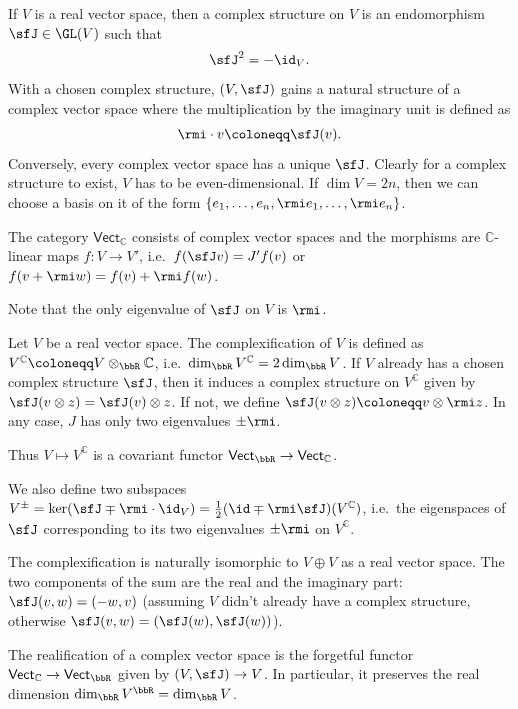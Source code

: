 \begin{defn}
    If $V$ is a real vector space, then a complex structure on $V$ is an endomorphism $\sfJ\in \GL(V)$ such that 
    \[\sfJ^2=-\id_V.\]
    With a chosen complex structure, $(V,\sfJ)$ gains a natural structure of a complex vector space where the multiplication by the imaginary unit is defined as
    \[\rmi\cdot v\coloneqq \sfJ(v).\]
    Conversely, every complex vector space has a unique $\sfJ$. Clearly for a complex structure to exist, $V$ has to be even-dimensional. If $\dim V=2n$, then we can choose a basis on it of the form $\{e_1,\ldots,e_n,\rmi e_1,\ldots,\rmi e_n\}$.
    
    The category $\mathsf{Vect}_{\mathbb{C}}$ consists of complex vector spaces and the morphisms are $\mathbb{C}$-linear maps $f:V\to V'$, i.e.\ $f(\sfJ v)=J' f(v)$ or $f(v+\rmi w)=f(v)+\rmi f(w)$.
\end{defn}

Note that the only eigenvalue of $\sfJ$ on $V$ is $\rmi$.

\begin{defn}[Complexification]\label{def complexification}
    Let $V$ be a real vector space. The complexification of $V$ is defined as $V^\mathbb{C}\coloneqq V\otimes_\bbR \mathbb{C}$, i.e.\ $\dim_\bbR V^\mathbb{C}=2\dim_\bbR V$. If $V$ already has a chosen complex structure $\sfJ$, then it induces a complex structure on $V^\mathbb{C}$ given by $\sfJ(v\otimes z)=\sfJ(v)\otimes z$. If not, we define $\sfJ(v\otimes z)\coloneqq v\otimes \rmi z$. In any case, $J$ has only two eigenvalues $\pm \rmi$.
    
    Thus $V\mapsto V^{\mathbb{C}}$ is a covariant functor $\mathsf{Vect}_\bbR \to \mathsf{Vect}_\mathbb{C}$.
    
    We also define two subspaces $V^\pm=\ker(\sfJ\mp \rmi\cdot\id_V)=\frac12(\id\mp \rmi \sfJ)(V^\mathbb{C})$, i.e.\ the eigenspaces of $\sfJ$ corresponding to its two eigenvalues $\pm \rmi$ on $V^\mathbb{C}$.
\end{defn}

The complexification is naturally isomorphic to $V\oplus V$ as a real vector space. The two components of the sum are the real and the imaginary part: $\sfJ(v,w)=(-w,v)$ (assuming $V$ didn't already have a complex structure, otherwise $\sfJ(v,w)=(\sfJ(w),\sfJ(w))$).


\begin{defn}[Realification]
    The realification of a complex vector space is the forgetful functor $\mathsf{Vect}_\mathbb{C}\to\mathsf{Vect}_\bbR $ given by $(V,\sfJ)\to V$. In particular, it preserves the real dimension $\dim_\bbR V^\bbR =\dim_\bbR V$.
\end{defn}

